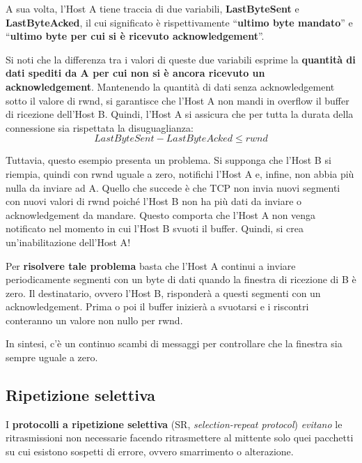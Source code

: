 \documentclass[a4paper]{article}
\newcommand{\dquotes}[1]{``#1''}
\begin{document}
	\noindent
	A sua volta, l’\textsf{Host A} tiene traccia di due variabili, \textbf{\textsf{LastByteSent}} e \textbf{\textsf{LastByteAcked}}, il cui significato è rispettivamente \dquotes{\textbf{ultimo byte mandato}} e \dquotes{\textbf{ultimo byte per cui si è ricevuto acknowledgement}}.\newline
	
	\noindent
	Si noti che la differenza tra i valori di queste due variabili esprime la \textbf{quantità di dati spediti da A per cui non si è ancora ricevuto un acknowledgement}. Mantenendo la quantità di dati senza acknowledgement sotto il valore di \textsf{rwnd}, si garantisce che l’\textsf{Host A} non mandi in overflow il buffer di ricezione dell’\textsf{Host B}. Quindi, l’\textsf{Host A} si assicura che per tutta la durata della connessione sia rispettata la disuguaglianza:
	\begin{equation*}
		LastByteSent - LastByteAcked \le rwnd
	\end{equation*}\newpage

	\noindent
	Tuttavia, questo esempio presenta un problema. Si supponga che l’\textsf{Host B} si riempia, quindi con \textsf{rwnd} uguale a zero, notifichi l’\textsf{Host A} e, infine, non abbia più nulla da inviare ad A. Quello che succede è che TCP non invia nuovi segmenti con nuovi valori di \textsf{rwnd} poiché l’\textsf{Host B} non ha più dati da inviare o acknowledgement da mandare. Questo comporta che l’\textsf{Host A} non venga notificato nel momento in cui l’\textsf{Host B} svuoti il buffer. Quindi, si crea un’inabilitazione dell’\textsf{Host A}!\newline
	
	\noindent
	Per \textbf{risolvere tale problema} basta che l’\textsf{Host A} continui a inviare periodicamente segmenti con un byte di dati quando la finestra di ricezione di B è zero. Il destinatario, ovvero l’\textsf{Host B}, risponderà a questi segmenti con un acknowledgement. Prima o poi il buffer inizierà a svuotarsi e i riscontri conteranno un valore non nullo per \textsf{rwnd}.\newline
	
	\noindent
	In sintesi, c’è un continuo scambi di messaggi per controllare che la finestra sia sempre uguale a zero.
	
	\subsection{Ripetizione selettiva}
	
	I \textcolor{Red3}{\textbf{protocolli a ripetizione selettiva}} (SR, \emph{selection-repeat protocol}) \emph{evitano} le ritrasmissioni non necessarie facendo ritrasmettere al mittente solo quei pacchetti su cui esistono sospetti di errore, ovvero smarrimento o alterazione.\newline
	
\end{document}
